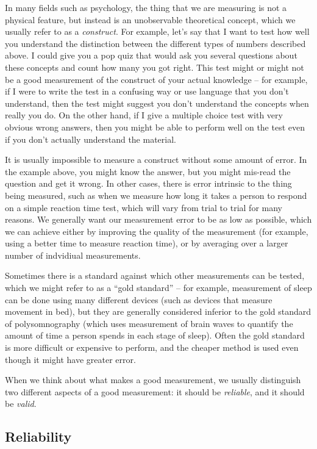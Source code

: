 \documentclass[
  12pt,
]{book}
\begin{document}
In many fields such as psychology, the thing that we are measuring is not a physical feature, but instead is an unobservable theoretical concept, which we usually refer to as a \emph{construct}. For example, let's say that I want to test how well you understand the distinction between the different types of numbers described above. I could give you a pop quiz that would ask you several questions about these concepts and count how many you got right. This test might or might not be a good measurement of the construct of your actual knowledge -- for example, if I were to write the test in a confusing way or use language that you don't understand, then the test might suggest you don't understand the concepts when really you do. On the other hand, if I give a multiple choice test with very obvious wrong answers, then you might be able to perform well on the test even if you don't actually understand the material.

It is usually impossible to measure a construct without some amount of error. In the example above, you might know the answer, but you might mis-read the question and get it wrong. In other cases, there is error intrinsic to the thing being measured, such as when we measure how long it takes a person to respond on a simple reaction time test, which will vary from trial to trial for many reasons. We generally want our measurement error to be as low as possible, which we can achieve either by improving the quality of the measurement (for example, using a better time to measure reaction time), or by averaging over a larger number of indvidiual measurements.

Sometimes there is a standard against which other measurements can be tested, which we might refer to as a ``gold standard'' -- for example, measurement of sleep can be done using many different devices (such as devices that measure movement in bed), but they are generally considered inferior to the gold standard of polysomnography (which uses measurement of brain waves to quantify the amount of time a person spends in each stage of sleep). Often the gold standard is more difficult or expensive to perform, and the cheaper method is used even though it might have greater error.

When we think about what makes a good measurement, we usually distinguish two different aspects of a good measurement: it should be \emph{reliable}, and it should be \emph{valid}.

\hypertarget{reliability}{%
\subsection{Reliability}\label{reliability}}
\end{document}
